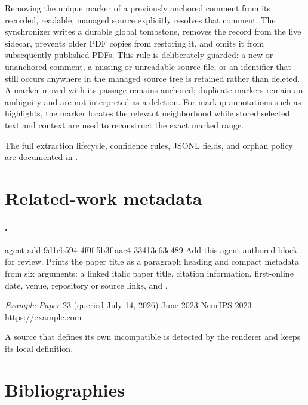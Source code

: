 Removing the unique marker of a previously anchored comment from its recorded, readable, managed  source explicitly resolves that comment.
The synchronizer writes a durable global tombstone, removes the record from the live sidecar, prevents older PDF copies from restoring it, and omits it from subsequently published PDFs.
This rule is deliberately guarded: a new or unanchored comment, a missing or unreadable source file, or an identifier that still occurs anywhere in the managed source tree is retained rather than deleted.
A marker moved with its passage remains anchored; duplicate markers remain an ambiguity and are not interpreted as a deletion.
For markup annotations such as highlights, the marker locates the relevant neighborhood while stored selected text and context are used to reconstruct the exact marked range.

The full extraction lifecycle, confidence rules, JSONL fields, and orphan policy are documented in
.

\section*{Related-work metadata}

\paragraph{\code{\relatedWorkMeta}.}
\agentProposedEdit
  {agent-add-9d1cb594-4f0f-5b3f-aac4-33413e63c489}
  {Add this agent-authored block for review.}
  {}
  {Prints the paper title as a paragraph heading and compact metadata from six arguments: a linked italic paper title, citation information, first-online date, venue, repository or source links, and .}

\begin{DocCode}
\relatedWorkMeta
  {\href{https://example.com/paper}{\emph{Example Paper}}}
  {23 (queried July 14, 2026)}
  {June 2023}
  {NeurIPS 2023}
  {\url{https://example.com}}
  {-}
\end{DocCode}

A source that defines its own incompatible \code{\relatedWorkMeta} is detected by the renderer and keeps its local definition.

\section*{Bibliographies}

